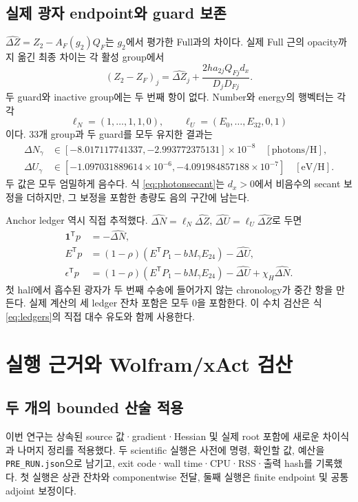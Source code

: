 \subsection{실제 광자 endpoint와 guard 보존}
$\widehat{\Delta Z}=Z_2-A_F(g_2)Q_F$는 $g_2$에서 평가한 Full과의 차이다. 실제 Full 근의 opacity까지 옮긴 최종 차이는 각 활성 group에서
\begin{equation}
(Z_2-Z_F)_j=\widehat{\Delta Z}_j
+\frac{2ha_{2j}Q_{Fj}d_x}{D_jD_{Fj}}.
\label{eq:photonsecant}
\end{equation}
두 guard와 inactive group에는 두 번째 항이 없다. Number와 energy의 행벡터는 각각
\begin{equation}
\ell_N=(1,\ldots,1,1,0),\qquad
\ell_U=(E_0,\ldots,E_{32},0,1)
\label{eq:photonrows}
\end{equation}
이다. 33개 group과 두 guard를 모두 유지한 결과는
\begin{align}
\Delta N_\gamma&\in[-8.017117741337,-2.993772375131]\times10^{-8}
\quad[\mathrm{photons/H}],\\
\Delta U_\gamma&\in[-1.097031889614\times10^{-6},-4.091984857188\times10^{-7}]
\quad[\mathrm{eV/H}].
\label{eq:photonresults}
\end{align}
두 값은 모두 엄밀하게 음수다. 식 \eqref{eq:photonsecant}는 $d_x>0$에서 비음수의 secant 보정을 더하지만, 그 보정을 포함한 총량도 음의 구간에 남는다.\cite{app16}

Anchor ledger 역시 직접 추적했다. $\widehat{\Delta N}=\ell_N\widehat{\Delta Z}$, $\widehat{\Delta U}=\ell_U\widehat{\Delta Z}$로 두면
\begin{align}
\mathbf1^{\mathsf T}p&=-\widehat{\Delta N},\\
E^{\mathsf T}p&=(1-\rho)(E^{\mathsf T}P_1-bM_\gamma E_{24})-\widehat{\Delta U},\\
\epsilon^{\mathsf T}p&=(1-\rho)(E^{\mathsf T}P_1-bM_\gamma E_{24})
-\widehat{\Delta U}+\chi_H\widehat{\Delta N}.
\label{eq:ledgers}
\end{align}
첫 half에서 흡수된 광자가 두 번째 수송에 들어가지 않는 chronology가 중간 항을 만든다. 실제 계산의 세 ledger 잔차 포함은 모두 0을 포함한다. 이 수치 검산은 식 \eqref{eq:ledgers}의 직접 대수 유도와 함께 사용한다.

\section{실행 근거와 Wolfram/xAct 검산}\label{sec:execution}
\subsection{두 개의 bounded 산술 적용}
이번 연구는 상속된 source 값·gradient·Hessian 및 실제 root 포함에 새로운 차이식과 나머지 정리를 적용했다. 두 scientific 실행은 사전에 명령, 확인할 값, 예산을 \texttt{PRE\_RUN.json}으로 남기고, exit code·wall time·CPU·RSS·출력 hash를 기록했다. 첫 실행은 상관 잔차와 componentwise 전달, 둘째 실행은 finite endpoint 및 공통 adjoint 보정이다.


